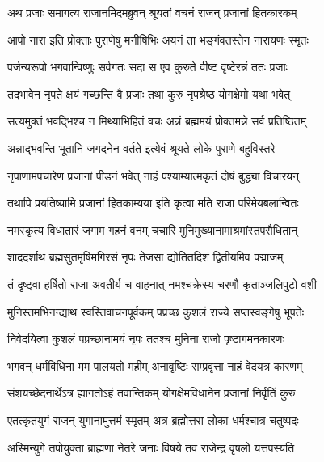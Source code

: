 \twolineshloka
{अथ प्रजाः समागत्य राजानमिदमब्रुवन्}
{श्रूयतां वचनं राजन् प्रजानां हितकारकम्} %

\twolineshloka
{आपो नारा इति प्रोक्ताः पुराणेषु मनीषिभिः}
{अयनं ता भङ्गंवतस्तेन नारायणः स्मृतः} %

\twolineshloka
{पर्जन्यरूपो भगवान्विष्णुः सर्वगतः सदा}
{स एव कुरुते वीष्ट वृष्टेरन्नं ततः प्रजाः} %

\twolineshloka
{तदभावेन नृपते क्षयं गच्छन्ति वै प्रजाः}
{तथा कुरु नृपश्रेष्ठ योगक्षेमो यथा भवेत्} %


\twolineshloka
{सत्यमुक्तं भवद्भिश्च न मिथ्याभिहितं वचः}
{अन्नं ब्रह्ममयं प्रोक्तमन्ने सर्व प्रतिष्ठितम्} %

\twolineshloka
{अन्नाद्भवन्ति भूतानि जगदनेन वर्तते}
{इत्येवं श्रूयते लोके पुराणे बहुविस्तरे} %

\twolineshloka
{नृपाणामपचारेण प्रजानां पीडनं भवेत्}
{नाहं पश्याम्यात्मकृतं दोषं बुद्ध्या विचारयन्} %

\twolineshloka
{तथापि प्रयतिष्यामि प्रजानां हितकाम्यया}
{इति कृत्वा मति राजा परिमेयबलान्वितः} %

\twolineshloka
{नमस्कृत्य विधातारं जगाम गहनं वनम्}
{चचारि मुनिमुख्यानामाश्रमांस्तपसैधितान्} %

\twolineshloka
{शाददर्शाथ ब्रह्मसुतमृषिमगिरसं नृपः}
{तेजसा द्योतितदिशं द्वितीयमिव पद्माजम्} %

\twolineshloka
{तं दृष्ट्वा हर्षितो राजा अवतीर्य च वाहनात्}
{नमश्चक्रेस्य चरणौ कृताञ्जलिपुटो वशी} %

\twolineshloka
{मुनिस्तमभिनन्द्याथ स्वस्तिवाचनपूर्वकम्}
{पप्रच्छ कुशलं राज्ये सप्तस्वङ्गेषु भूपतेः} %

\twolineshloka
{निवेदयित्वा कुशलं पप्रच्छानामयं नृपः}
{ततश्च मुनिना राजो पृष्टागमनकारणः} %



\twolineshloka
{भगवन् धर्मविधिना मम पालयतो महीम्}
{अनावृष्टिः सम्प्रवृत्ता नाहं वेदयत्र कारणम्} %

\twolineshloka
{संशयच्छेदनार्थेऽत्र ह्यागतोऽहं तवान्तिकम्}
{योगक्षेमविधानेन प्रजानां निर्वृतिं कुरु} %


\twolineshloka
{एतत्कृतयुगं राजन् युगानामुत्तमं स्मृतम्}
{अत्र ब्रह्मोत्तरा लोका धर्मश्चात्र चतुष्पदः} %

\twolineshloka
{अस्मिन्युगे तपोयुक्ता ब्राह्मणा नेतरे जनाः}
{विषये तव राजेन्द्र वृषलो यत्तपस्यति} %

